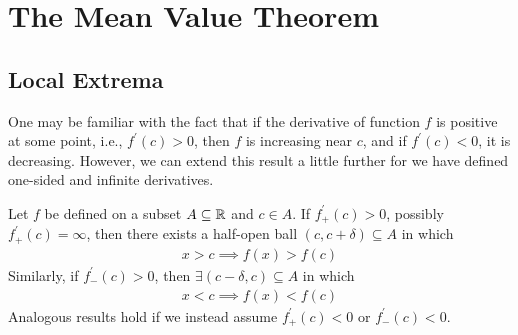 \documentclass[thmcnt=section, 12pt]{my-elegantbook}
\begin{document}

\section{The Mean Value Theorem} 


\subsection{Local Extrema}

\par One may be familiar with the fact that if the derivative of function $f$ is positive at some point, i.e., $f^\prime(c) > 0$, then $f$ is increasing near $c$, and if $f^\prime(c) < 0$, it is decreasing. However, we can extend this result a little further for we have defined one-sided and infinite derivatives.

\begin{theorem} \label{thm:14}
    Let $f$ be defined on a subset $A \subseteq \mathbb{R}$ and $c \in A$. If $f^\prime_+(c) > 0$, possibly $f^\prime_+(c) = \infty$, then there exists a half-open ball $(c, c+\delta) \subseteq A$ in which
    \begin{align}
        x > c \implies f(x) > f(c)
        \label{eq:12}
    \end{align}
    Similarly, if $f^\prime_{-}(c) > 0$, then $\exists (c-\delta, c) \subseteq A$ in which
    \begin{align*}
        x < c \implies f(x) < f(c)
    \end{align*}
    Analogous results hold if we instead assume $f^\prime_{+}(c) < 0$ or $f^\prime_{-}(c) < 0$.
\end{theorem}
\end{document}
